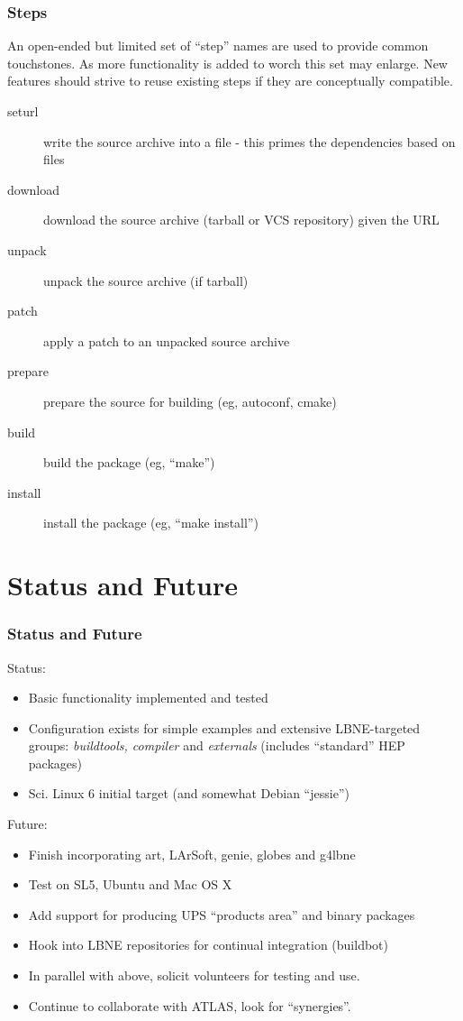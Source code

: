 \documentclass[xcolor=dvipsnames]{beamer}
\begin{document}
\begin{frame}
  \frametitle{Steps}

  An open-ended but limited set of ``step'' names are used to provide
  common touchstones.  As more functionality is added to worch this
  set may enlarge.  New features should strive to reuse existing steps
  if they are conceptually compatible.
  \begin{description}
  \item[seturl] write the source archive into a file - this primes the dependencies based on files
  \item[download] download the source archive (tarball or VCS repository) given the URL
  \item[unpack] unpack the source archive (if tarball)
  \item[patch] apply a patch to an unpacked source archive
  \item[prepare] prepare the source for building (eg, autoconf, cmake)
  \item[build] build the package (eg, ``make'')
  \item[install] install the package (eg, ``make install'')
  \end{description}

\end{frame}

\section{Status and Future}

\begin{frame}
\tableofcontents[
currentsection,currentsubsection,
hideothersubsections,sectionstyle=show/shaded,
] 
\end{frame}

\begin{frame}
  \frametitle{Status and Future}
  Status:
  \begin{itemize}
  \item Basic functionality implemented and tested
  \item Configuration exists for simple examples and extensive
    LBNE-targeted groups: \textit{buildtools, compiler} and
    \textit{externals} (includes ``standard'' HEP packages)
  \item Sci. Linux 6 initial target (and somewhat Debian ``jessie'')
  \end{itemize}
  Future:
  \begin{itemize}
  \item Finish incorporating art, LArSoft, genie, globes and g4lbne
  \item Test on SL5, Ubuntu and Mac OS X
  \item Add support for producing UPS ``products area'' and binary packages
  \item Hook into LBNE repositories for continual integration (buildbot)
  \item In parallel with above, solicit volunteers for testing and use.
  \item Continue to collaborate with ATLAS, look for ``synergies''.
  \end{itemize}
\end{frame}
\end{document}
